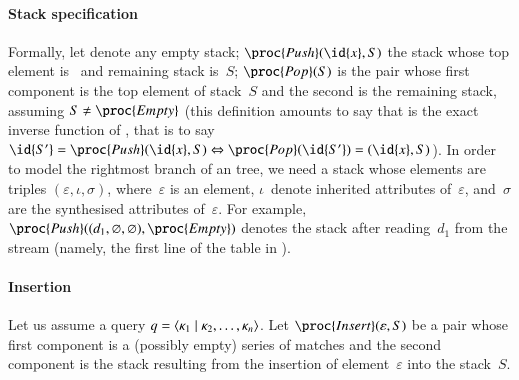 \paragraph{Stack specification}

Formally, let  denote any empty stack; \(\proc{Push}
(\id{x}, S)\) the stack whose top element is~ and remaining
stack is~\(S\); \(\proc{Pop} (S)\) is the pair whose first component
is the top element of stack~\(S\) and the second is the remaining
stack, assuming \(S \neq \proc{Empty}\) (this definition amounts to
say that  is the exact inverse function of , that
is to say \(\id{S'} = \proc{Push} (\id{x}, S) \Leftrightarrow
\proc{Pop}(\id{S'}) = (\id{x}, S)\)). In order to model the rightmost
branch of an \XML tree, we need a stack whose elements are triples
\((\varepsilon, \iota, \sigma)\), where~\(\varepsilon\) is an element,
\(\iota\)~denote inherited attributes of~\(\varepsilon\),
and~\(\sigma\) are the synthesised attributes of~\(\varepsilon\). For
example, \(\proc{Push} ((d_1, \varnothing, \varnothing),
\proc{Empty})\) denotes the stack after reading~\(d_1\) from the
stream (namely, the first line of the table in
).

\paragraph{Insertion}

Let us assume a query \(q = \langle \kappa_1 \mid \kappa_2, \dots,
  \kappa_n\rangle\). Let \(\proc{Insert} (\varepsilon, S)\) be a pair
whose first component is a (possibly empty) series of matches and the
second component is the stack resulting from the insertion of
element~\(\varepsilon\) into the stack~\(S\).

